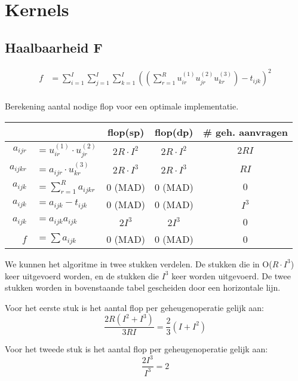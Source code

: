 \chapter{Kernels}
\label{h:kernels} 



\section{Haalbaarheid F}
\label{h:kernels:f:haal}

\begin{align*}
	f &= \sum_{i = 1}^I \sum_{j = 1}^I \sum_{k = 1}^I \left( \left( \sum_{r=1}^{R} u^{(1)}_{i r} u^{(2)}_{j r} u^{(3)}_{k r} \right) - t_{ijk}\right)^2 \\
\end{align*}

Berekening aantal nodige flop voor een optimale implementatie.

\begin{tabular}{|r l|c| c|c|}
\hline
					&							& flop(sp)			& flop(dp) 			& \# geh. aanvragen	\\
\hline
$a_{ij r} $	&$= u^{(1)}_{i r} \cdot%
u^{(2)}_{j r}$									& $2 R \cdot I^2$	& $2 R \cdot I^2$	&	$2RI$			\\
$a_{ijk r} $&$= a_{ij r} \cdot u^{(3)}_{k r}$	& $2 R \cdot I^3$	& $2 R \cdot I^3$	&	$RI$			\\
$a_{ijk} $	&$= \sum_{r=1}^{R} a_{ijk r}$		& 0 (MAD)			& 0 (MAD)			&	$0$				\\
\hline
$a_{ijk} $	&$= a_{ijk}  - t_{ijk}$				& 0 (MAD)			& 0 (MAD)			&	$I^3$			\\
$a_{ijk} $	&$= a_{ijk} a_{ijk}$				& $2 I^3$			& $2 I^3$			&	0				\\
$f $		&$= \sum a_{ijk}$					& 0 (MAD)			& 0 (MAD)			&	0				\\
\hline
\end{tabular}

We kunnen het algoritme in twee stukken verdelen. De stukken die in O($R \cdot I^3$) keer uitgevoerd worden, en de stukken die $ I^3$ keer worden uitgevoerd. De twee stukken worden in bovenstaande tabel gescheiden door een horizontale lijn.

Voor het eerste stuk is het aantal flop per geheugenoperatie gelijk aan:
\[
    \frac{2R (I^2 + I^3)}{3RI} = \frac{2}{3}(I + I^2)
\]

Voor het tweede stuk is het aantal flop per geheugenoperatie gelijk aan:
\[
    \frac{2I^3}{I^3} = 2
\]

